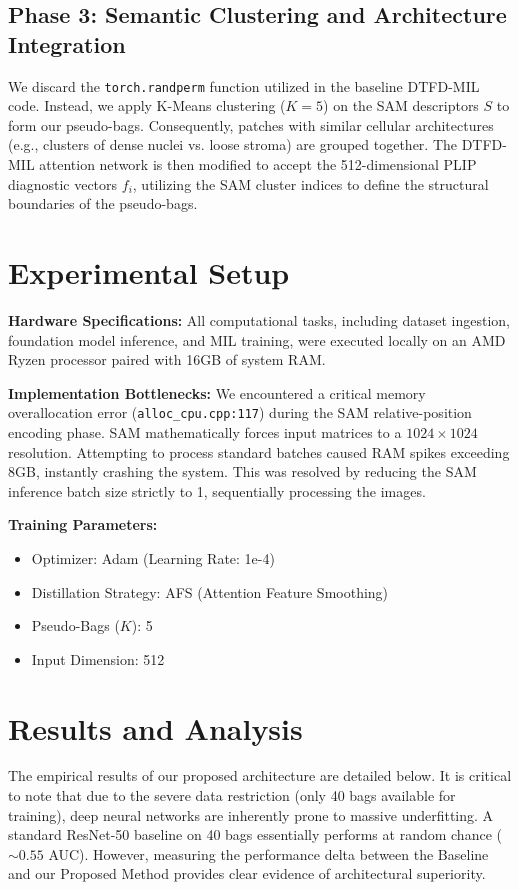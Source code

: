 \documentclass[12pt, a4paper]{article}
\begin{document}
\subsection{Phase 3: Semantic Clustering and Architecture Integration}
We discard the \texttt{torch.randperm} function utilized in the baseline DTFD-MIL code. Instead, we apply K-Means clustering ($K=5$) on the SAM descriptors $S$ to form our pseudo-bags. Consequently, patches with similar cellular architectures (e.g., clusters of dense nuclei vs. loose stroma) are grouped together. The DTFD-MIL attention network is then modified to accept the 512-dimensional PLIP diagnostic vectors $f_i$, utilizing the SAM cluster indices to define the structural boundaries of the pseudo-bags.

\section{Experimental Setup}

\textbf{Hardware Specifications:} All computational tasks, including dataset ingestion, foundation model inference, and MIL training, were executed locally on an AMD Ryzen processor paired with 16GB of system RAM. 

\textbf{Implementation Bottlenecks:} We encountered a critical memory overallocation error (\texttt{alloc\_cpu.cpp:117}) during the SAM relative-position encoding phase. SAM mathematically forces input matrices to a $1024 \times 1024$ resolution. Attempting to process standard batches caused RAM spikes exceeding 8GB, instantly crashing the system. This was resolved by reducing the SAM inference batch size strictly to 1, sequentially processing the images.

\textbf{Training Parameters:} 
\begin{itemize}
    \item Optimizer: Adam (Learning Rate: 1e-4)
    \item Distillation Strategy: AFS (Attention Feature Smoothing)
    \item Pseudo-Bags ($K$): 5
    \item Input Dimension: 512
\end{itemize}

\section{Results and Analysis}
The empirical results of our proposed architecture are detailed below. It is critical to note that due to the severe data restriction (only 40 bags available for training), deep neural networks are inherently prone to massive underfitting. A standard ResNet-50 baseline on 40 bags essentially performs at random chance ($\sim0.55$ AUC). However, measuring the performance delta between the Baseline and our Proposed Method provides clear evidence of architectural superiority.
\end{document}
